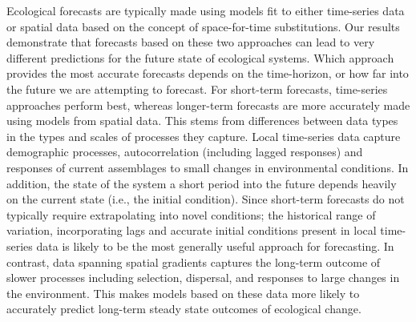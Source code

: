 \documentclass[11pt]{article}
\begin{document}
Ecological forecasts are typically made using models fit to either time-series data or spatial data based on the concept of space-for-time substitutions.
Our results demonstrate that forecasts based on these two approaches can lead to very different predictions for the future state of ecological systems.
Which approach provides the most accurate forecasts depends on the time-horizon, or how far into the future we are attempting to forecast.
For short-term forecasts, time-series approaches perform best, whereas longer-term forecasts are more accurately made using models from spatial data.
This stems from differences between data types in the types and scales of processes they capture.
Local time-series data capture demographic processes, autocorrelation (including lagged responses) and responses of current assemblages to small changes
in environmental conditions. In addition, the state of the system a short period into the future depends heavily on the current state (i.e., the initial
condition). Since short-term forecasts do not typically require extrapolating into novel conditions; the historical range of variation, incorporating lags
and accurate initial conditions present in local time-series data is likely to be the most generally useful approach for forecasting.
In contrast, data spanning spatial gradients captures the long-term outcome of slower processes including selection, dispersal, and responses to large
changes in the environment. This makes models based on these data more likely to accurately predict long-term steady state outcomes of ecological change.
\end{document}

